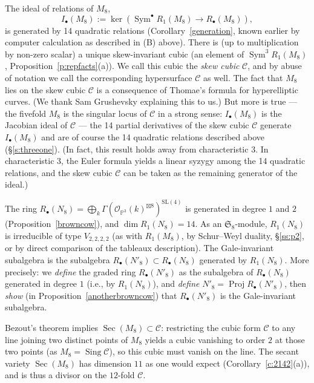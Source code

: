 \documentclass{amsart}
\theoremstyle{definition}
\theoremstyle{remark}
\DeclareMathOperator{\Sing}{Sing}
\DeclareMathOperator{\Proj}{Proj}
\DeclareMathOperator{\Sym}{Sym}
\DeclareMathOperator{\Sec}{Sec}
\def\SL{\mathrm{SL}}
\def\SS{\mathfrak{S}}
\def\proj{\mathbb{P}}
\def\cubic{\mathcal{C}}
\let\mc\mathcal
\begin{document}
The ideal of relations of $M_8$,
\begin{displaymath}
I_{\bullet}(M_8) := \ker(\Sym^{\bullet}  R_1(M_8) \to R_{\bullet}(M_8)),
\end{displaymath}
is generated by 14 quadratic relations (Corollary~\ref{generation}, known earlier by computer calculation as described in
(B) above).  There is (up to multiplication by non-zero scalar) a
unique skew-invariant cubic (an element of
$\Sym^3 R_1(M_8)$, Proposition~\ref{p:repfacts}(a)).  We call this cubic the {\em skew cubic} $\cubic$, and by abuse of
notation we call the corresponding hypersurface $\cubic$ as well.  
 The fact that $M_8$ lies on the skew cubic $\cubic$ is a consequence
  of Thomae's formula for hyperelliptic curves.  (We thank Sam
  Grushevsky explaining this to us.)
But more is true ---  the fivefold $M_8$ is the singular locus of
$\cubic$ in a strong sense: $I_{\bullet}(M_8)$ is the Jacobian ideal of $\cubic$ --- the 14 partial derivatives of
the skew cubic $\cubic$ generate $I_{\bullet}(M_8)$  and are of course the 14 quadratic relations described above
(\S \ref{s:threeone}).  (In fact, this result holds away from characteristic $3$.  In characteristic $3$, the Euler
formula yields a linear syzygy among the 14 quadratic relations, and the skew cubic $\cubic$ can be taken as the
remaining generator of the ideal.)

The ring $R_{\bullet}(N_8) = \bigoplus_k \Gamma(\mc{O}_{\proj^3}(k)^{\boxtimes 8})^{\SL(4)}$ is generated in degree
$1$ and $2$ (Proposition~\ref{browncow}), and $\dim R_1(N_8)=14$.  As an $\SS_8$-module, $R_1(N_8)$ is irreducible of type
$V_{2,2,2,2}$ (as with $R_1(M_8)$, by Schur--Weyl duality, \S \ref{ss:p2}, or by direct comparison of the tableaux
description).  The Gale-invariant subalgebra is the subalgebra $R_{\bullet}(N'_8) \subset
R_{\bullet}(N_8)$ generated by $R_1(N_8)$.  More precisely:  we {\em define} the graded
ring $R_{\bullet}(N'_8)$ as the subalgebra of $R_{\bullet}(N_8)$ generated in degree $1$ (i.e., by $R_1(N_8)$),
and {\em define} $N'_8 = \Proj R_{\bullet}(N'_8)$, then {\em show} 
 (in Proposition~\ref{anotherbrowncow})
that $R_{\bullet}(N'_8)$ is the Gale-invariant
subalgebra.

Bezout's theorem implies $\Sec(M_8) \subset \cubic$:  restricting the cubic form $\cubic$ to any line joining two
distinct points of $M_8$ yields a cubic vanishing to order $2$ at those two points (as $M_8 = \Sing \cubic$), so this
cubic must vanish on the line.  The secant variety $\Sec(M_8)$ has
dimension $11$  as one would expect (Corollary~\ref{c:2142}(a)), and is
thus a divisor on the $12$-fold $\cubic$.
\end{document}

